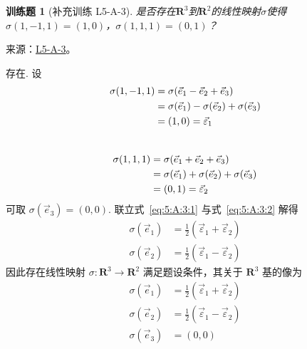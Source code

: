 \documentclass[UTF8,12pt,a4paper,fontset=fandol]{ctexart}
\newtheorem{exercise}{训练题}[section]
\begin{document}
\begin{exercise}[补充训练 L5-A-3]\label{prob:L5-A-3}
是否存在$\mathbf{R}^3$到$\mathbf{R}^2$的线性映射$\sigma$使得$\sigma(1,-1,1)=(1,0)$，$\sigma(1,1,1)=(0,1)$？
\end{exercise}
\noindent 来源：\href{https://github.com/yhwu-is/Linear-Algebra-Left-Undone/blob/new/%E8%AE%B2%E4%B9%89/%E4%B8%93%E9%A2%98/5%20%E7%BA%BF%E6%80%A7%E6%98%A0%E5%B0%84.tex}{L5-A-3}。
\begin{solve}
存在. 设
          \begin{align}
              \sigma(1, -1, 1) & = \sigma(\vec{e}_1 - \vec{e}_2 + \vec{e}_3) \notag                 \\
                               & = \sigma(\vec{e}_1) - \sigma(\vec{e}_2) + \sigma(\vec{e}_3) \notag \\
                               & = (1, 0) = \vec{\varepsilon}_1 \label{eq:5:A:3:1}
          \end{align} \\
          \begin{align}
              \sigma(1, 1, 1) & = \sigma(\vec{e}_1 + \vec{e}_2 + \vec{e}_3) \notag                 \\
                              & = \sigma(\vec{e}_1) + \sigma(\vec{e}_2) + \sigma(\vec{e}_3) \notag \\
                              & = (0, 1) = \vec{\varepsilon}_2 \label{eq:5:A:3:2}
          \end{align}
          可取 $ \sigma(\vec{e}_3) = (0, 0) $. 联立式~\eqref{eq:5:A:3:1} 与式~\eqref{eq:5:A:3:2} 解得
          \begin{align*}
              \sigma(\vec{e}_1) & = \frac{1}{2} (\vec{\varepsilon}_1 + \vec{\varepsilon}_2) \\
              \sigma(\vec{e}_2) & = \frac{1}{2} (\vec{\varepsilon}_1 - \vec{\varepsilon}_2)
          \end{align*}
          因此存在线性映射 $ \sigma : \mathbf{R}^3 \to \mathbf{R}^2 $ 满足题设条件，其关于 $ \mathbf{R}^3 $ 基的像为
          \begin{align*}
              \sigma(\vec{e}_1) & = \frac{1}{2} (\vec{\varepsilon}_1 + \vec{\varepsilon}_2) \\
              \sigma(\vec{e}_2) & = \frac{1}{2} (\vec{\varepsilon}_1 - \vec{\varepsilon}_2) \\
              \sigma(\vec{e}_3) & = (0, 0)
          \end{align*}
\end{solve}
\end{document}

